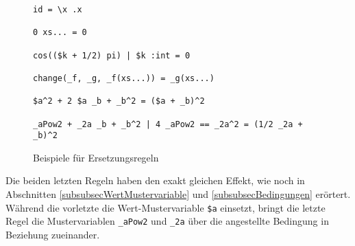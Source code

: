 \begin{figure}
\begin{unbreakable}\begin{verbatim}
id = \x .x

0 xs... = 0

cos(($k + 1/2) pi) | $k :int = 0

change(_f, _g, _f(xs...)) = _g(xs...)

$a^2 + 2 $a _b + _b^2 = ($a + _b)^2

_aPow2 + _2a _b + _b^2 | 4 _aPow2 == _2a^2 = (1/2 _2a + _b)^2
\end{verbatim}\end{unbreakable}
\caption{Beispiele für Ersetzungsregeln}
\label{figBspRegeln}
\end{figure}
Die beiden letzten Regeln haben den exakt gleichen Effekt, wie noch in Abschnitten \ref{subsubsecWertMustervariable} und \ref{subsubsecBedingungen} erörtert. Während die vorletzte die Wert-Mustervariable \verb|$a| einsetzt, bringt die letzte Regel die Mustervariablen \verb|_aPow2| und \verb|_2a| über die angestellte Bedingung in Beziehung zueinander.



